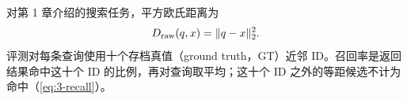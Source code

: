对第 1 章介绍的搜索任务，平方欧氏距离为
\begin{equation}
 D_{\mathrm{raw}}(q,x)=\|q-x\|_2^2.
 \label{eq:2-raw}
\end{equation}
评测对每条查询使用十个存档真值（ground truth，GT）近邻 ID。召回率是返回结果命中这十个 ID 的比例，再对查询取平均；这十个 ID 之外的等距候选不计为命中（\cref{eq:3-recall}）。
